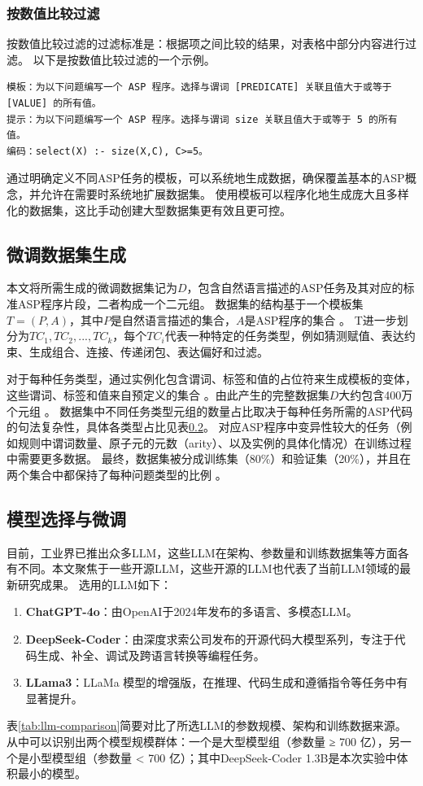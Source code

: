 \subsubsection{按数值比较过滤}
按数值比较过滤的过滤标准是：根据项之间比较的结果，对表格中部分内容进行过滤。
以下是按数值比较过滤的一个示例。
\begin{lstlisting}
模板：为以下问题编写一个 ASP 程序。选择与谓词 [PREDICATE] 关联且值大于或等于 [VALUE] 的所有值。
提示：为以下问题编写一个 ASP 程序。选择与谓词 size 关联且值大于或等于 5 的所有值。
编码：select(X) :- size(X,C), C>=5。
\end{lstlisting}

通过明确定义不同ASP任务的模板，可以系统地生成数据，确保覆盖基本的ASP概念，并允许在需要时系统地扩展数据集。
使用模板可以程序化地生成庞大且多样化的数据集，这比手动创建大型数据集更有效且更可控。
\subsection{微调数据集生成}
本文将所需生成的微调数据集记为$D$，包含自然语言描述的ASP任务及其对应的标准ASP程序片段，二者构成一个二元组。
数据集的结构基于一个模板集$T = (P, A)$，其中$P$是自然语言描述的集合，$A$是ASP程序的集合 。
T进一步划分为${TC_1, TC_2,..., TC_k}$，每个$TC_i$代表一种特定的任务类型，例如猜测赋值、表达约束、生成组合、连接、传递闭包、表达偏好和过滤。

对于每种任务类型，通过实例化包含谓词、标签和值的占位符来生成模板的变体，这些谓词、标签和值来自预定义的集合 。由此产生的完整数据集$D$大约包含400万个元组 。
数据集中不同任务类型元组的数量占比取决于每种任务所需的ASP代码的句法复杂性，具体各类型占比见表\ref{}。
对应ASP程序中变异性较大的任务（例如规则中谓词数量、原子元的元数（arity）、以及实例的具体化情况）在训练过程中需要更多数据。
最终，数据集被分成训练集（80\%）和验证集（20\%），并且在两个集合中都保持了每种问题类型的比例 。


\subsection{模型选择与微调}
目前，工业界已推出众多LLM，这些LLM在架构、参数量和训练数据集等方面各有不同。本文聚焦于一些开源LLM，这些开源的LLM也代表了当前LLM领域的最新研究成果。
选用的LLM如下：
\begin{enumerate}[itemsep=0pt,parsep=0pt]
\item \textbf{ChatGPT-4o}：由OpenAI于2024年发布的多语言、多模态LLM。
\item \textbf{DeepSeek-Coder}：由深度求索公司发布的开源代码大模型系列，专注于代码生成、补全、调试及跨语言转换等编程任务。
\item \textbf{LLama3}：LLaMa 模型的增强版，在推理、代码生成和遵循指令等任务中有显著提升。
\end{enumerate}
表\ref{tab:llm-comparison}简要对比了所选LLM的参数规模、架构和训练数据来源。
从中可以识别出两个模型规模群体：一个是大型模型组（参数量 ≥ 700 亿），另一个是小型模型组（参数量 < 700 亿）；其中DeepSeek-Coder 1.3B是本次实验中体积最小的模型。

